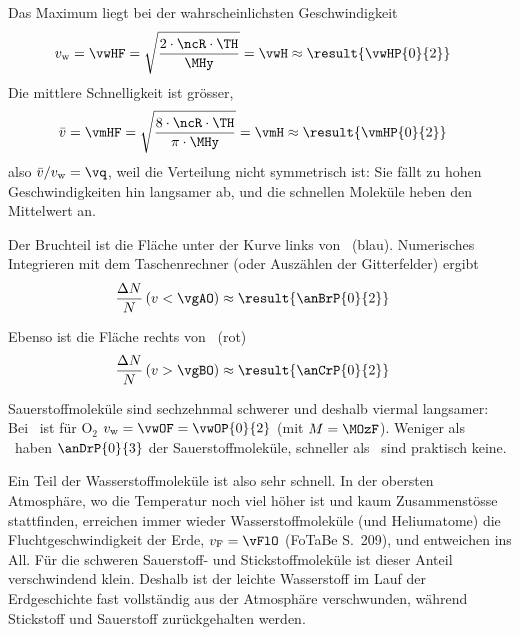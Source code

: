 \begin{abcliste}
\abc Das Maximum liegt bei der wahrscheinlichsten Geschwindigkeit
\begin{align}
 v_\text{w} &= \vwHF = \sqrt{\frac{2\cdot\ncR\cdot\TH}{\MHy}} = \vwH \approx \result{\vwHP{0}{2}}
\end{align}
Die mittlere Schnelligkeit ist grösser,
\begin{align}
 \bar v &= \vmHF = \sqrt{\frac{8\cdot\ncR\cdot\TH}{\pi\cdot\MHy}} = \vmH \approx \result{\vmHP{0}{2}}
\end{align}
also $\bar v/v_\text{w} = \vq$, weil die Verteilung nicht symmetrisch ist: Sie fällt zu hohen Geschwindigkeiten hin langsamer ab, und die schnellen Moleküle heben den Mittelwert an.

\abc Der Bruchteil ist die Fläche unter der Kurve links von \vgAO\ (blau). Numerisches Integrieren mit dem Taschenrechner (oder Auszählen der Gitterfelder) ergibt
\begin{align}
 \frac{\Delta N}{N}\left(v < \vgAO\right) &\approx \result{\anBrP{0}{2}}
\end{align}

\abc Ebenso ist die Fläche rechts von \vgBO\ (rot)
\begin{align}
 \frac{\Delta N}{N}\left(v > \vgBO\right) &\approx \result{\anCrP{0}{2}}
\end{align}

\abc Sauerstoffmoleküle sind sechzehnmal schwerer und deshalb viermal langsamer: Bei \THO\ ist für $\mathrm{O_2}$ $v_\text{w} = \vwOF = \vwOP{0}{2}$ (mit $M = \MOzF$). Weniger als \vgAO\ haben $\anDrP{0}{3}$ der Sauerstoffmoleküle, schneller als \vgBO\ sind praktisch keine.

Ein Teil der Wasserstoffmoleküle ist also sehr schnell. In der obersten Atmosphäre, wo die Temperatur noch viel höher ist und kaum Zusammenstösse stattfinden, erreichen immer wieder Wasserstoffmoleküle (und Heliumatome) die Fluchtgeschwindigkeit der Erde, $v_\text{F} = \vFlO$ (FoTaBe S.~209), und entweichen ins All. Für die schweren Sauerstoff- und Stickstoffmoleküle ist dieser Anteil verschwindend klein. Deshalb ist der leichte Wasserstoff im Lauf der Erdgeschichte fast vollständig aus der Atmosphäre verschwunden, während Stickstoff und Sauerstoff zurückgehalten werden.
\end{abcliste}
